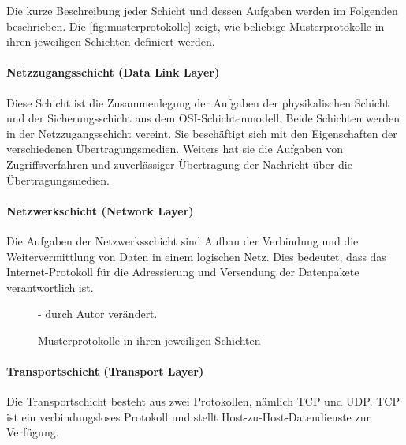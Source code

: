 Die kurze Beschreibung jeder Schicht und dessen Aufgaben werden im Folgenden beschrieben. Die \autoref{fig:musterprotokolle} zeigt, wie beliebige Musterprotokolle in ihren jeweiligen Schichten definiert werden. \smallskip \smallskip

\paragraph{Netzzugangsschicht (Data Link Layer)} Diese Schicht ist die Zusammenlegung der Aufgaben der physikalischen Schicht und der Sicherungsschicht aus dem OSI-Schichtenmodell. Beide Schichten werden in der Netzzugangsschicht vereint. Sie beschäftigt sich mit den Eigenschaften der verschiedenen Übertragungsmedien. Weiters hat sie die Aufgaben von Zugriffsverfahren und zuverlässiger Übertragung der Nachricht über die Übertragungsmedien.

\paragraph{Netzwerkschicht (Network Layer)} Die Aufgaben der Netzwerksschicht sind Aufbau der Verbindung und die Weitervermittlung von Daten in einem logischen Netz. Dies bedeutet, dass das Internet-Protokoll für die Adressierung und Versendung der Datenpakete verantwortlich ist.

\begin{figure}[htbp]
	\centering
	\caption[Musterprotokolle in ihren jeweiligen Schichten]{Musterprotokolle in ihren jeweiligen Schichten \cite{Jones:TCPIP}}\label{fig:musterprotokolle} - durch Autor verändert.
\end{figure}

\paragraph{Transportschicht (Transport Layer)} Die Transportschicht besteht aus zwei Protokollen, nämlich TCP und UDP. TCP ist ein verbindungsloses Protokoll und stellt Host-zu-Host-Datendienste zur Verfügung. 

